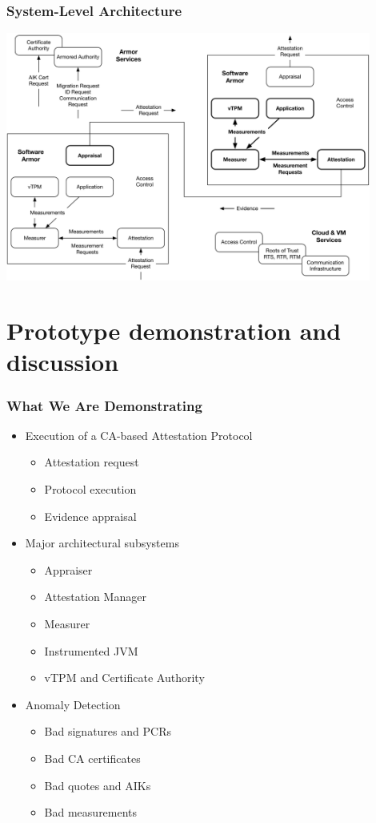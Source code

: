 \documentclass{beamer}
\begin{document}
\begin{frame}
  \frametitle{System-Level Architecture}
  \begin{center}
  \includegraphics[width=0.9\textwidth]{figures/system.pdf}
  \end{center}
\end{frame}

\section{Prototype demonstration and discussion}

\begin{frame}
  \frametitle{What We Are Demonstrating}
  
  \begin{itemize}
  \item Execution of a CA-based Attestation Protocol
    \begin{itemize}
    \item Attestation request
    \item Protocol execution
    \item Evidence appraisal
    \end{itemize}
  \item Major architectural subsystems
    \begin{itemize}
    \item Appraiser
    \item Attestation Manager
    \item Measurer
    \item Instrumented JVM
    \item vTPM and Certificate Authority
    \end{itemize}
  \item Anomaly Detection
    \begin{itemize}
    \item Bad signatures and PCRs
    \item Bad CA certificates
    \item Bad quotes and AIKs
    \item Bad measurements
    \end{itemize}
  \end{itemize}
\end{frame}
\end{document}
